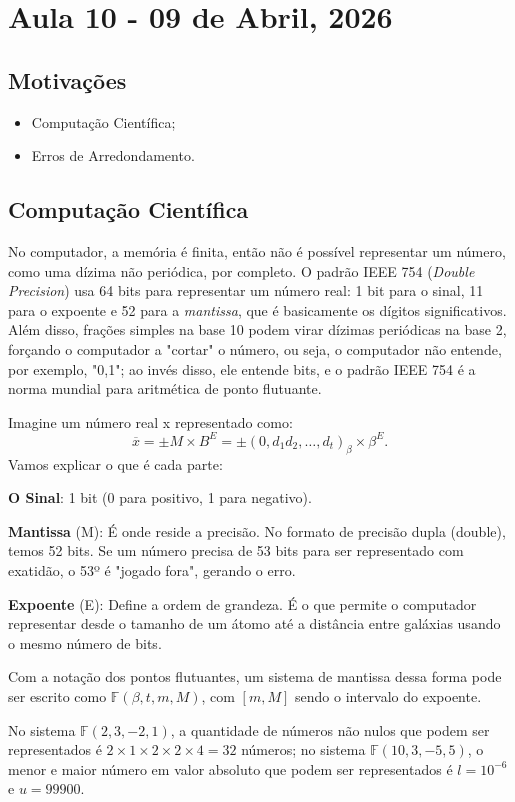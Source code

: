 \documentclass[../numerical_methods.tex]{subfiles}
\begin{document}
\section{Aula 10 - 09 de Abril, 2026}
\subsection{Motivações}
\begin{itemize}
	\item Computação Científica;
	\item Erros de Arredondamento.
\end{itemize}
\subsection{Computação Científica}
No computador, a memória é finita, então não é possível representar um número, como uma dízima não periódica, por completo. O padrão IEEE 754 (\textit{Double Precision}) usa 64 bits para representar um número real: 1 bit para o sinal, 11 para o expoente e 52 para a \textit{mantissa}, que é basicamente os dígitos significativos.
Além disso, frações simples na base 10 podem virar dízimas periódicas na base 2, forçando o computador a "cortar" o número, ou seja, o computador não entende, por exemplo, "0,1"; ao invés disso, ele entende bits, e o padrão IEEE 754 é a norma mundial para aritmética de ponto flutuante.

Imagine um número real x representado como:
\[
	\overline{x} = \pm M \times B^{E} = \pm (0, d_1 d_2, \dotsc , d_{t})_{\beta }\times \beta^{E}.
\]
Vamos explicar o que é cada parte:

\textbf{O Sinal}: 1 bit (0 para positivo, 1 para negativo).

\textbf{Mantissa} (M): É onde reside a precisão. No formato de precisão dupla (double), temos 52 bits. Se um número precisa de 53 bits para ser representado com exatidão, o 53º é "jogado fora", gerando o erro.

\textbf{Expoente} (E): Define a ordem de grandeza. É o que permite o computador representar desde o tamanho de um átomo até a distância entre galáxias usando o mesmo número de bits.

Com a notação dos pontos flutuantes, um sistema de mantissa dessa forma pode ser escrito como \(\mathbb{F}(\beta , t, m, M)\), com \([m, M]\) sendo o intervalo do expoente.
\begin{example}
	No sistema \(\mathbb{F}(2, 3, -2, 1)\), a quantidade de números não nulos que podem ser representados é \(2 \times 1 \times 2 \times 2 \times 4 = 32\) números; no sistema \(\mathbb{F}(10, 3, -5, 5)\), o menor e maior número em valor absoluto que podem ser representados é \(l = 10^{-6}\) e \(u = 99900.\)
\end{example}
\end{document}

